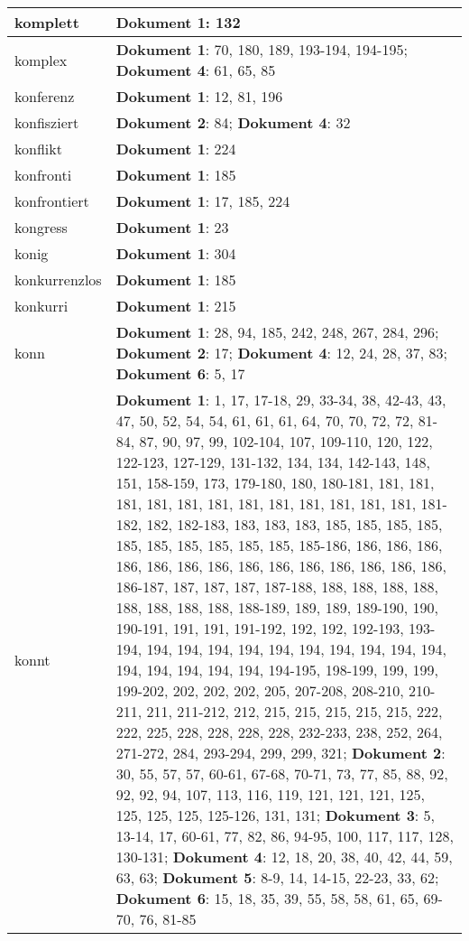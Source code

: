 \documentclass[a5paper]{article}
\begin{document}
\begin{longtable}[l]{|l|p{3in}|}
\hline
komplett & \textbf{Dokument 1}: 132 \\
\hline
komplex & \textbf{Dokument 1}: 70, 180, 189, 193-194, 194-195; \textbf{Dokument 4}: 61, 65, 85 \\
\hline
konferenz & \textbf{Dokument 1}: 12, 81, 196 \\
\hline
konfisziert & \textbf{Dokument 2}: 84; \textbf{Dokument 4}: 32 \\
\hline
konflikt & \textbf{Dokument 1}: 224 \\
\hline
konfronti & \textbf{Dokument 1}: 185 \\
\hline
konfrontiert & \textbf{Dokument 1}: 17, 185, 224 \\
\hline
kongress & \textbf{Dokument 1}: 23 \\
\hline
konig & \textbf{Dokument 1}: 304 \\
\hline
konkurrenzlos & \textbf{Dokument 1}: 185 \\
\hline
konkurri & \textbf{Dokument 1}: 215 \\
\hline
konn & \textbf{Dokument 1}: 28, 94, 185, 242, 248, 267, 284, 296; \textbf{Dokument 2}: 17; \textbf{Dokument 4}: 12, 24, 28, 37, 83; \textbf{Dokument 6}: 5, 17 \\
\hline
konnt & \textbf{Dokument 1}: 1, 17, 17-18, 29, 33-34, 38, 42-43, 43, 47, 50, 52, 54, 54, 61, 61, 61, 64, 70, 70, 72, 72, 81-84, 87, 90, 97, 99, 102-104, 107, 109-110, 120, 122, 122-123, 127-129, 131-132, 134, 134, 142-143, 148, 151, 158-159, 173, 179-180, 180, 180-181, 181, 181, 181, 181, 181, 181, 181, 181, 181, 181, 181, 181, 181-182, 182, 182-183, 183, 183, 183, 185, 185, 185, 185, 185, 185, 185, 185, 185, 185, 185-186, 186, 186, 186, 186, 186, 186, 186, 186, 186, 186, 186, 186, 186, 186, 186-187, 187, 187, 187, 187-188, 188, 188, 188, 188, 188, 188, 188, 188, 188-189, 189, 189, 189-190, 190, 190-191, 191, 191, 191-192, 192, 192, 192-193, 193-194, 194, 194, 194, 194, 194, 194, 194, 194, 194, 194, 194, 194, 194, 194, 194, 194-195, 198-199, 199, 199, 199-202, 202, 202, 202, 205, 207-208, 208-210, 210-211, 211, 211-212, 212, 215, 215, 215, 215, 215, 222, 222, 225, 228, 228, 228, 228, 232-233, 238, 252, 264, 271-272, 284, 293-294, 299, 299, 321; \textbf{Dokument 2}: 30, 55, 57, 57, 60-61, 67-68, 70-71, 73, 77, 85, 88, 92, 92, 92, 94, 107, 113, 116, 119, 121, 121, 121, 125, 125, 125, 125, 125-126, 131, 131; \textbf{Dokument 3}: 5, 13-14, 17, 60-61, 77, 82, 86, 94-95, 100, 117, 117, 128, 130-131; \textbf{Dokument 4}: 12, 18, 20, 38, 40, 42, 44, 59, 63, 63; \textbf{Dokument 5}: 8-9, 14, 14-15, 22-23, 33, 62; \textbf{Dokument 6}: 15, 18, 35, 39, 55, 58, 58, 61, 65, 69-70, 76, 81-85 \\

\end{longtable}
\end{document}
